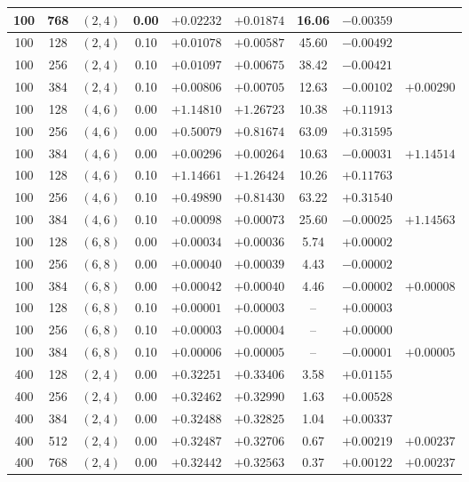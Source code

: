 \begin{table}[!htbp]
\begin{tabular}{@{}ccccccccc@{}}
100  & 768 & $(2,4)$ & 0.00 & $+0.02232$ & $+0.01874$ & 16.06 & $-0.00359$ &  \\
\hline
100  & 128 & $(2,4)$ & 0.10 & $+0.01078$ & $+0.00587$ & 45.60 & $-0.00492$ &  \\
100  & 256 & $(2,4)$ & 0.10 & $+0.01097$ & $+0.00675$ & 38.42 & $-0.00421$ &  \\
100  & 384 & $(2,4)$ & 0.10 & $+0.00806$ & $+0.00705$ & 12.63 & $-0.00102$ & $+0.00290$ \\
\hline
100  & 128 & $(4,6)$ & 0.00 & $+1.14810$ & $+1.26723$ & 10.38 & $+0.11913$ &  \\
100  & 256 & $(4,6)$ & 0.00 & $+0.50079$ & $+0.81674$ & 63.09 & $+0.31595$ &  \\
100  & 384 & $(4,6)$ & 0.00 & $+0.00296$ & $+0.00264$ & 10.63 & $-0.00031$ & $+1.14514$ \\
\hline
100  & 128 & $(4,6)$ & 0.10 & $+1.14661$ & $+1.26424$ & 10.26 & $+0.11763$ &  \\
100  & 256 & $(4,6)$ & 0.10 & $+0.49890$ & $+0.81430$ & 63.22 & $+0.31540$ &  \\
100  & 384 & $(4,6)$ & 0.10 & $+0.00098$ & $+0.00073$ & 25.60 & $-0.00025$ & $+1.14563$ \\
\hline
100  & 128 & $(6,8)$ & 0.00 & $+0.00034$ & $+0.00036$ &  5.74 & $+0.00002$ &  \\
100  & 256 & $(6,8)$ & 0.00 & $+0.00040$ & $+0.00039$ &  4.43 & $-0.00002$ &  \\
100  & 384 & $(6,8)$ & 0.00 & $+0.00042$ & $+0.00040$ &  4.46 & $-0.00002$ & $+0.00008$ \\
\hline
100  & 128 & $(6,8)$ & 0.10 & $+0.00001$ & $+0.00003$ & -- & $+0.00003$ &  \\
100  & 256 & $(6,8)$ & 0.10 & $+0.00003$ & $+0.00004$ & -- & $+0.00000$ &  \\
100  & 384 & $(6,8)$ & 0.10 & $+0.00006$ & $+0.00005$ & -- & $-0.00001$ & $+0.00005$ \\
\hline
400  & 128 & $(2,4)$ & 0.00 & $+0.32251$ & $+0.33406$ &  3.58 & $+0.01155$ &  \\
400  & 256 & $(2,4)$ & 0.00 & $+0.32462$ & $+0.32990$ &  1.63 & $+0.00528$ &  \\
400  & 384 & $(2,4)$ & 0.00 & $+0.32488$ & $+0.32825$ &  1.04 & $+0.00337$ &  \\
400  & 512 & $(2,4)$ & 0.00 & $+0.32487$ & $+0.32706$ &  0.67 & $+0.00219$ & $+0.00237$ \\
400  & 768 & $(2,4)$ & 0.00 & $+0.32442$ & $+0.32563$ &  0.37 & $+0.00122$ & $+0.00237$ \\

\end{tabular}
\end{table}
